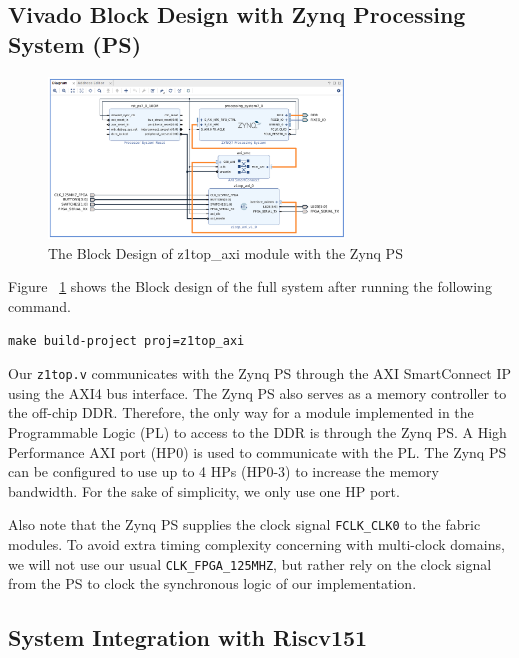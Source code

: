 \documentclass[11pt]{article}
\begin{document}
\subsection{Vivado Block Design with Zynq Processing System (PS)}

\begin{figure}[hbt]
\begin{center}
  \includegraphics[width=0.7\textwidth]{images/vivado_bd_z1top_axi.png}
  \caption{The Block Design of z1top\_axi module with the Zynq PS}
  \label{fig:z1top_axi}
\end{center}
\end{figure}

Figure ~\ref{fig:z1top_axi} shows the Block design of the full system after running the following command.

\begin{verbatim}
make build-project proj=z1top_axi
\end{verbatim}

Our \verb|z1top.v| communicates with the Zynq PS through the AXI SmartConnect IP using the AXI4 bus interface. The Zynq PS also serves as a memory controller to the off-chip DDR. Therefore, the only way for a module implemented in the Programmable Logic (PL) to access to the DDR is through the Zynq PS. A High Performance AXI port (HP0) is used to communicate with the PL. The Zynq PS can be configured to use up to 4 HPs (HP0-3) to increase the memory bandwidth. For the sake of simplicity, we only use one HP port.

Also note that the Zynq PS supplies the clock signal \verb|FCLK_CLK0| to the fabric modules. To avoid extra timing complexity concerning with multi-clock domains, we will not use our usual \verb|CLK_FPGA_125MHZ|, but rather rely on the clock signal from the PS to clock the synchronous logic of our implementation.

\subsection{System Integration with Riscv151}
\end{document}
